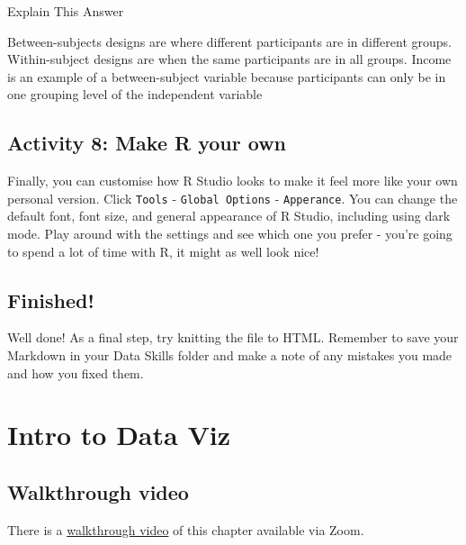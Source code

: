 \documentclass[
  oneside]{book}
\begin{document}
Explain This Answer

Between-subjects designs are where different participants are in different groups. Within-subject designs are when the same participants are in all groups. Income is an example of a between-subject variable because participants can only be in one grouping level of the independent variable

\hypertarget{activity-8-make-r-your-own}{%
\section{Activity 8: Make R your own}\label{activity-8-make-r-your-own}}

Finally, you can customise how R Studio looks to make it feel more like your own personal version. Click \texttt{Tools} - \texttt{Global\ Options} - \texttt{Apperance}. You can change the default font, font size, and general appearance of R Studio, including using dark mode. Play around with the settings and see which one you prefer - you're going to spend a lot of time with R, it might as well look nice!

\hypertarget{finished-3}{%
\section{Finished!}\label{finished-3}}

Well done! As a final step, try knitting the file to HTML. Remember to save your Markdown in your Data Skills folder and make a note of any mistakes you made and how you fixed them.

\hypertarget{intro-to-data-viz}{%
\chapter{Intro to Data Viz}\label{intro-to-data-viz}}

\hypertarget{walkthrough-video-4}{%
\section{Walkthrough video}\label{walkthrough-video-4}}

There is a \href{https://uofglasgow.zoom.us/rec/play/Q9BA93fhXCTrTyRF962J8cWI7YDQ1dca0u3sbPstj-ktY4e52jv_b5vtAZMgI6fAM3Cip_L0itlsym8.zF0_1My59xl1MGmG?startTime=1602848670000\&_x_zm_rtaid=O3m7PQzzQaOVR8tM0-Br7w.1602858026802.e830dc177e59e2fba3d0bc04b83ddf60\&_x_zm_rhtaid=842}{walkthrough video} of this chapter available via Zoom.
\end{document}
